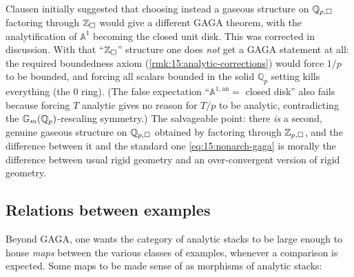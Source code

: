 \begin{remark}
\label{rmk:15:qp-overconvergent}
Clausen initially suggested that choosing instead a gaseous structure on
$\mathbb{Q}_{p,\square}$ factoring through $\mathbb{Z}_{\square}$ would give a different GAGA
theorem, with the analytification of $\mathbb{A}^1$ becoming the closed unit disk.
This was corrected in discussion. With that ``$\mathbb{Z}_{\square}$'' structure one does \emph{not}
get a GAGA statement at all: the required boundedness axiom
(\cref{rmk:15:analytic-corrections}) would force $1/p$ to be bounded, and forcing all
scalars bounded in the solid $\mathbb{Q}_p$ setting kills everything (the $0$ ring).
(The false expectation ``$\mathbb{A}^{1,\mathrm{an}} = $ closed disk'' also fails
because forcing $T$ analytic gives no reason for $T/p$ to be analytic, contradicting
the $\mathbb{G}_{m}(\mathbb{Q}_p)$-rescaling symmetry.) The salvageable point: there \emph{is} a
second, genuine gaseous structure on $\mathbb{Q}_{p,\square}$ obtained by factoring
through $\mathbb{Z}_{p,\square}$, and the difference between it and the standard one
\eqref{eq:15:nonarch-gaga} is morally the difference between usual rigid geometry and
an over-convergent version of rigid geometry.
\end{remark}

\subsection{Relations between examples}

Beyond GAGA, one wants the category of analytic stacks to be large enough to house
\emph{maps} between the various classes of examples, whenever a comparison is
expected. Some maps to be made sense of as morphisms of analytic stacks:

